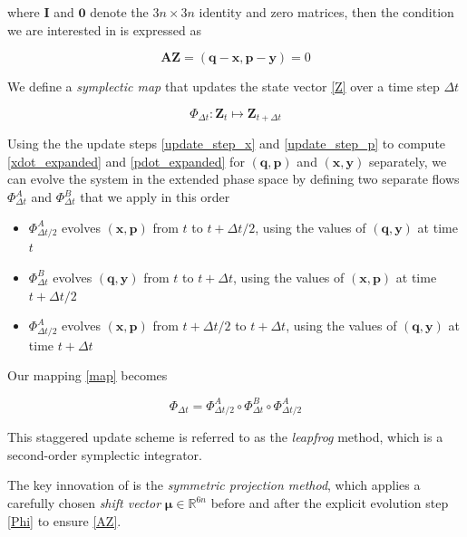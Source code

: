 \documentclass[12pt,a4paper]{article}
\theoremstyle{definition}
\theoremstyle{remark}
\begin{document}
where $\mathbf{I}$ and $\mathbf{0}$ denote the $3n \times 3n$ identity and zero matrices, then the condition we are interested in is expressed as

\begin{equation}\label{AZ}
    \mathbf{A} \mathbf{Z} = (\mathbf{q} - \mathbf{x}, \mathbf{p} - \mathbf{y}) = 0
\end{equation}

We define a \textit{symplectic map} that updates the state vector \eqref{Z} over a time step $\Delta t$

\begin{equation}\label{map}
    \Phi_{\Delta t}: \mathbf{Z}_t \mapsto \mathbf{Z}_{t+\Delta t}
\end{equation}

Using the the update steps \eqref{update_step_x} and \eqref{update_step_p} to compute \eqref{xdot_expanded} and \eqref{pdot_expanded} for $(\mathbf{q}, \mathbf{p})$ and $(\mathbf{x}, \mathbf{y})$ separately, we can evolve the system in the extended phase space by defining two separate flows $\Phi^A_{\Delta t}$ and $\Phi^B_{\Delta t}$ that we apply in this order

\begin{itemize}
    \item $\Phi^A_{\Delta t / 2}$ evolves $(\mathbf{x}, \mathbf{p})$ from $t$ to $t + \Delta t / 2$, using the values of $(\mathbf{q}, \mathbf{y})$ at time $t$
    \item $\Phi^B_{\Delta t}$ evolves $(\mathbf{q}, \mathbf{y})$ from $t$ to $t + \Delta t$, using the values of $(\mathbf{x}, \mathbf{p})$ at time $t + \Delta t / 2$
    \item $\Phi^A_{\Delta t / 2}$ evolves $(\mathbf{x}, \mathbf{p})$ from $t + \Delta t / 2$ to $t + \Delta t$, using the values of $(\mathbf{q}, \mathbf{y})$ at time $t + \Delta t$
\end{itemize}

Our mapping \eqref{map} becomes

\begin{equation}\label{Phi}
    \boxed{\Phi_{\Delta t} = \Phi^A_{\Delta t/2} \circ \Phi^B_{\Delta t} \circ \Phi^A_{\Delta t/2}}
\end{equation}

This staggered update scheme is referred to as the \textit{leapfrog} method, which is a second-order symplectic integrator.

The key innovation of \citep{Jayawardana2023} is the \textit{symmetric projection method}, which applies a carefully chosen \textit{shift vector} $\boldsymbol{\mu} \in \mathbb{R}^{6n}$ before and after the explicit evolution step \eqref{Phi} to ensure \eqref{AZ}.
\end{document}
